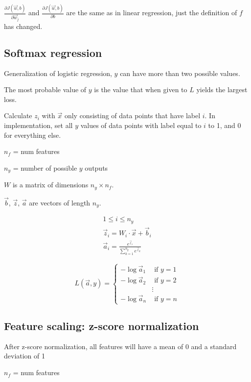 \documentclass[12pt]{article}
\begin{document}
$\frac{\partial J(\vec{w},b)}{\partial \vec{w}_j}$ and $\frac{\partial J(\vec{w},b)}{\partial b}$ are the same as in linear regression, just the definition of $f$ has changed.

\subsection{Softmax regression}

Generalization of logistic regression, $y$ can have more than two possible values.

The most probable value of $y$ is the value that when given to $L$ yields the largest loss.

Calculate $z_i$ with $\vec{x}$ only consisting of data points that have label $i$. In implementation, set all $y$ values of data points with label equal to $i$ to 1, and 0 for everything else.

$n_f$ = num features

$n_y$ = number of possible $y$ outputs

$W$ is a matrix of dimensions $n_y \times n_f$.

$\vec{b}$, $\vec{z}$, $\vec{a}$ are vectors of length $n_y$.

\begin{gather*}
    1 \leq i \leq n_y\\
    \vec{z}_i = W_i \cdot \vec{x} + \vec{b}_i\\
    \vec{a}_i = \frac{e^{\vec{z}_i}}{\sum_{k=1}^{n_y} e^{\vec{z}_k}}
\end{gather*}

\begin{equation}
L(\vec{a}, y) =
  \left\{
    \begin{aligned}
    -\log \vec{a}_1 &\text{ if } y = 1\\
    -\log \vec{a}_2 &\text{ if } y = 2\\
    & \vdots\\
    -\log \vec{a}_n &\text{ if } y = n
    \end{aligned}
   \right.
\end{equation}

\subsection{Feature scaling: z-score normalization}

After z-score normalization, all features will have a mean of 0 and a standard deviation of 1

$n_f$ = num features
\end{document}

